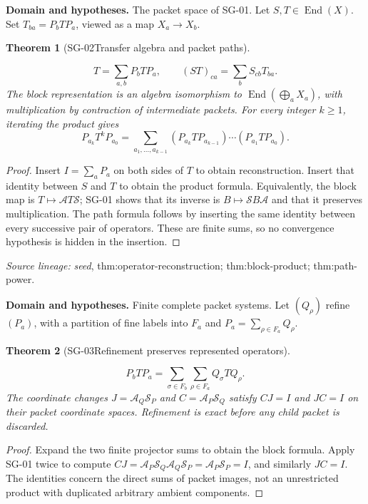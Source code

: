 \documentclass[11pt]{article}
\newtheorem{theorem}{Theorem}[section]
\theoremstyle{definition}\newtheorem{definition}[theorem]{Definition}
\theoremstyle{remark}\newtheorem{remark}[theorem]{Remark}
\begin{document}
\par{\small\textbf{Domain and hypotheses.} The packet space of SG-01. Let $S,T\in\operatorname{End}(X)$. Set $T_{ba}=P_bTP_a$, viewed as a map $X_a\to X_b$.}\par
\begin{theorem}[SG-02\quad Transfer algebra and packet paths]\label{SG-02}

\[
 T=\sum_{a,b}P_bTP_a,\qquad
 (ST)_{ca}=\sum_bS_{cb}T_{ba}.
\]
The block representation is an algebra isomorphism to
$\operatorname{End}(\bigoplus_aX_a)$, with multiplication by contraction of
intermediate packets. For every integer $k\ge1$, iterating the product gives
\[
 P_{a_k}T^kP_{a_0}
 =\sum_{a_1,\ldots,a_{k-1}}
 (P_{a_k}TP_{a_{k-1}})\cdots(P_{a_1}TP_{a_0}).
\]

\end{theorem}
\begin{proof}

Insert $I=\sum_aP_a$ on both sides of $T$ to obtain reconstruction. Insert
that identity between $S$ and $T$ to obtain the product formula. Equivalently,
the block map is $T\mapsto\mathcal A T\mathcal S$; SG-01 shows that its
inverse is $B\mapsto\mathcal S B\mathcal A$ and that it preserves multiplication.
The path formula follows by inserting the same identity between every
successive pair of operators. These are finite sums, so no convergence
hypothesis is hidden in the insertion.

\end{proof}

\par{\small\color{Teal}\textit{Source lineage:} \textit{seed}, thm:operator-reconstruction; thm:block-product; thm:path-power.}\par

\par{\small\textbf{Domain and hypotheses.} Finite complete packet systems. Let $(Q_\rho)$ refine $(P_a)$, with a partition of fine labels into $F_a$ and $P_a=\sum_{\rho\in F_a}Q_\rho$.}\par
\begin{theorem}[SG-03\quad Refinement preserves represented operators]\label{SG-03}

\[
 P_bTP_a=\sum_{\sigma\in F_b}\sum_{\rho\in F_a}Q_\sigma TQ_\rho.
\]
The coordinate changes $J=\mathcal A_Q\mathcal S_P$ and
$C=\mathcal A_P\mathcal S_Q$ satisfy $CJ=I$ and $JC=I$ on their packet
coordinate spaces. Refinement is exact before any child packet is discarded.

\end{theorem}
\begin{proof}

Expand the two finite projector sums to obtain the block formula. Apply
SG-01 twice to compute
$CJ=\mathcal A_P\mathcal S_Q\mathcal A_Q\mathcal S_P
=\mathcal A_P\mathcal S_P=I$, and similarly $JC=I$.
The identities concern the direct sums of packet images, not an unrestricted
product with duplicated arbitrary ambient components.

\end{proof}
\end{document}
